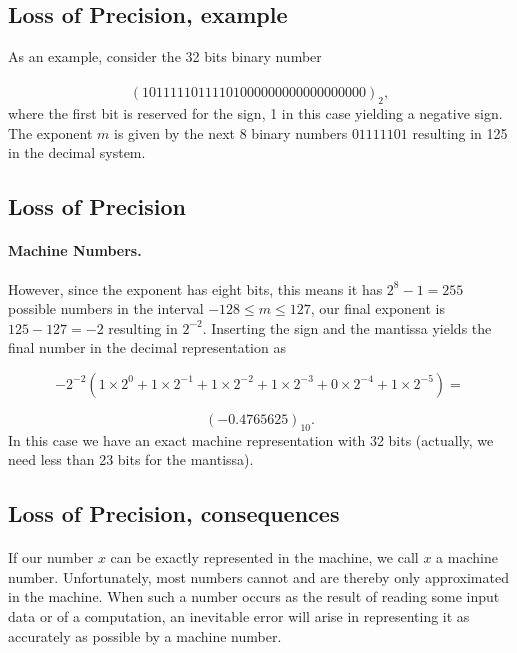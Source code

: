 \documentclass[%
oneside,                 %
final,                   %
10pt]{article}
\begin{document}
\subsection*{Loss of Precision, example}
As an example, consider the 32 bits binary number

\paragraph{}
\[
(10111110111101000000000000000000)_2,
\]
where the first bit is reserved for the sign, 1 in this case yielding a
negative sign. The exponent $m$ is given by the next 8 binary numbers
$01111101$ resulting in 125 in the decimal system.



\subsection*{Loss of Precision}


\paragraph{Machine Numbers.}
However, since the
exponent has eight bits, this means it has  $2^8-1=255$ possible numbers in the interval
$-128 \le m \le 127$, our final
exponent is $125-127=-2$ resulting in $2^{-2}$.
Inserting the sign and the mantissa yields the final number in the decimal representation as

\[
 -2^{-2}\left(1\times 2^0+1\times 2^{-1}+
1\times 2^{-2}+1\times 2^{-3}+0\times 2^{-4}+1\times 2^{-5}\right)=\]

\[
(-0.4765625)_{10}.
\]
In this case we have an exact machine representation with 32 bits (actually, we need less than
23 bits for the mantissa).



\subsection*{Loss of Precision, consequences}

\paragraph{}
If our number $x$ can be exactly represented in the machine, we call
$x$ a machine number. Unfortunately, most numbers cannot  and are thereby
only approximated in the machine. When such a number occurs as the result
of reading some input data or of a computation, an inevitable error
will arise in representing it as accurately as possible by
a machine number.
\end{document}
